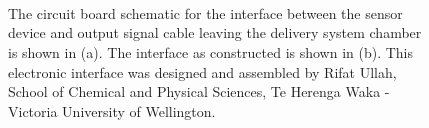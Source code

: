 \documentclass[
  a4paper,
]{scrbook}
\begin{document}
\begin{figure}
\begin{minipage}[t]{0.91\linewidth}
{}

\end{minipage}%
%
\begin{minipage}[t]{0.03\linewidth}

{\centering 

~

}

\end{minipage}%
\newline
\begin{minipage}[t]{0.03\linewidth}

{\centering 


}

\end{minipage}%
%
\begin{minipage}[t]{0.03\linewidth}

{\centering 

~

}

\end{minipage}%
%
\begin{minipage}[t]{0.91\linewidth}

{\centering 


}

\end{minipage}%
%
\begin{minipage}[t]{0.03\linewidth}

{\centering 

~

}

\end{minipage}%

\caption{\label{fig-device-interface}The circuit board schematic for the
interface between the sensor device and output signal cable leaving the
delivery system chamber is shown in (a). The interface as constructed is
shown in (b). This electronic interface was designed and assembled by
Rifat Ullah, School of Chemical and Physical Sciences, Te Herenga Waka -
Victoria University of Wellington.}

\end{figure}
\end{document}
